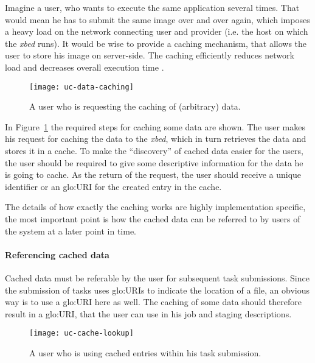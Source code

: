Imagine a user,  who wants to execute the  same application several times.
That would mean he has to submit the same image over and over again, which
imposes a heavy load on the network connecting user and provider (i.e. the
host on which the \emph{xbed} runs). It would be wise to provide a caching
mechanism, that  allows the  user to store  his image on  server-side. The
caching efficiently  reduces network load and  decreases overall execution
time \cite{locality-principle}.

\begin{figure}[h]
  \begin{center}
    \texttt{[image: uc-data-caching]}
  \end{center}
  \caption[UC  Data  Caching]{A user  who  is  requesting  the caching  of
    (arbitrary) data.}
  \label{fig:uc-data-caching}
\end{figure}

In  Figure~\ref{fig:uc-data-caching} the required  steps for  caching some
data are  shown. The user  makes his request  for caching the data  to the
\emph{xbed}, which in turn retrieves the data and stores it in a cache. To
make  the ``discovery''  of cached  data easier  for the  users,  the user
should be required to give some descriptive information for the data he is
going to  cache. As the return of  the request, the user  should receive a
unique identifier or an \gls{glo:URI} for the created entry in the cache.

The details  of how  exactly the caching  works are  highly implementation
specific, the most important point is  how the cached data can be referred
to by users of the system at a later point in time.

\paragraph{Referencing cached  data}

Cached data must be referable by the user for subsequent task submissions.
Since the submission of tasks uses \gls{glo:URI}s to indicate the location
of a  file, an obvious  way is  to use a  \gls{glo:URI} here as  well. The
caching of some data should  therefore result in a \gls{glo:URI}, that the
user can use in his job and staging descriptions.

\begin{figure}[h!]
  \begin{center}
    \texttt{[image: uc-cache-lookup]}
  \end{center}
  \caption[UC  Cache Lookup]{A user  who  is using cached entries within
    his task submission.}
  \label{fig:uc-cache-lookup}
\end{figure}

